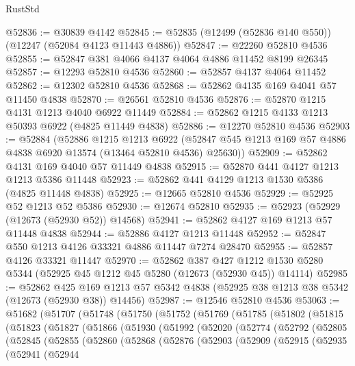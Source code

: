 \begin{lexlean}{RustStd}
\begin{coremodule}
@52836 := @30839 @4142
@52845 := @52835 (@12499 (@52836 @140 @550)) (@12247 (@52084 @4123 @11443 @4886))
@52847 := @22260 @52810 @4536
@52855 := @52847 @381 @4066 @4137 @4064 @4886 @11452 @8199 @26345
@52857 := @12293 @52810 @4536
@52860 := @52857 @4137 @4064 @11452
@52862 := @12302 @52810 @4536
@52868 := @52862 @4135 @169 @4041 @57 @11450 @4838
@52870 := @26561 @52810 @4536
@52876 := @52870 @1215 @4131 @1213 @4040 @6922 @11449
@52884 := @52862 @1215 @4133 @1213 @50393 @6922 (@4825 @11449 @4838)
@52886 := @12270 @52810 @4536
@52903 := @52884
    (@52886
      @1215
      @1213
      @6922
      (@52847 @545 @1213 @169 @57 @4886 @4838 @6920 @13574 (@13464 @52810 @4536) @25630))
@52909 := @52862 @4131 @169 @4040 @57 @11449 @4838
@52915 := @52870 @441 @4127 @1213 @1213 @5386 @11448
@52923 := @52862 @441 @4129 @1213 @1530 @5386 (@4825 @11448 @4838)
@52925 := @12665 @52810 @4536
@52929 := @52925 @52 @1213 @52 @5386
@52930 := @12674 @52810
@52935 := @52923 (@52929 (@12673 (@52930 @52)) @14568)
@52941 := @52862 @4127 @169 @1213 @57 @11448 @4838
@52944 := @52886 @4127 @1213 @11448
@52952 := @52847 @550 @1213 @4126 @33321 @4886 @11447 @7274 @28470
@52955 := @52857 @4126 @33321 @11447
@52970 := @52862
    @387
    @427
    @1212
    @1530
    @5280
    @5344
    (@52925 @45 @1212 @45 @5280 (@12673 (@52930 @45)) @14114)
@52985 := @52862
    @425
    @169
    @1213
    @57
    @5342
    @4838
    (@52925 @38 @1213 @38 @5342 (@12673 (@52930 @38)) @14456)
@52987 := @12546 @52810 @4536
@53063 := @51682
    (@51707
      (@51748
        (@51750
          (@51752
            (@51769
              (@51785
                (@51802
                  (@51815
                    (@51823
                      (@51827
                        (@51866
                          (@51930
                            (@51992
                              (@52020
                                (@52774
                                  (@52792
                                    (@52805
                                      (@52845
                                        (@52855
                                          (@52860
                                            (@52868
                                              (@52876
                                                (@52903
                                                  (@52909
                                                    (@52915
                                                      (@52935
                                                        (@52941
                                                          (@52944

\end{coremodule}
\end{lexlean}
